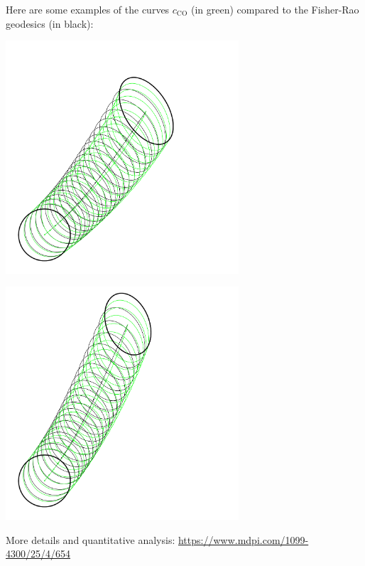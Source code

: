 \documentclass{article}
\def\CO{\mathrm{CO}}
\begin{document}
Here are some examples of the curves $c_\CO$ (in green) compared to the Fisher-Rao geodesics (in black):

\includegraphics[width=0.65\textwidth]{BivariateNormal-11918040.pdf}


\includegraphics[width=0.65\textwidth]{BivariateNormal-11892050.pdf}


More details and quantitative analysis: \url{https://www.mdpi.com/1099-4300/25/4/654}
\end{document}
